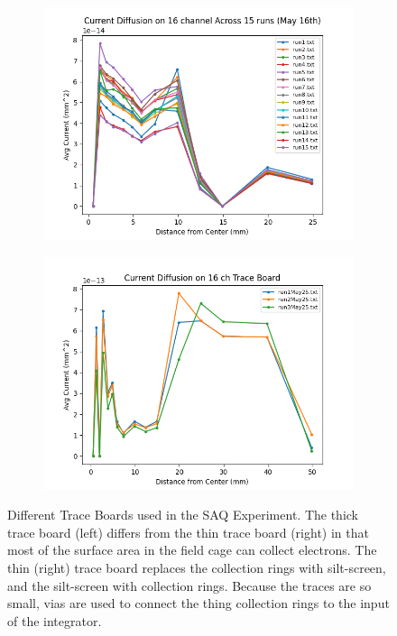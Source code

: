 \begin{figure}[]
\centering
\begin{subfigure}{.45\textwidth}
  \centering
  \includegraphics[width=\textwidth]{images/fullBoard_ConvertedAvgCurrentDiffusion.png}
  \caption{}
\end{subfigure}%
\begin{subfigure}{.45\textwidth}
  \centering
  \includegraphics[width=\textwidth]{images/traceBoard_ConvertedAvgCurrentDiffusion.png}
  \caption{}
\end{subfigure}
\caption{Different Trace Boards used in the SAQ Experiment.
The thick trace board (left) differs from the thin trace board (right) in that most of the surface area in the field cage can collect electrons.
The thin (right) trace board replaces the collection rings with silt-screen, and the silt-screen with collection rings.
Because the traces are so small, vias are used to connect the thing collection rings to the input of the integrator.
}
\label{fig:trace_boards_current_data}
\end{figure}

